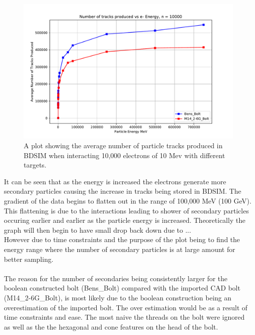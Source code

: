 \documentclass[12pt,a4paper]{article}
\begin{document}
\begin{figure}[h!]
\centering
\includegraphics[width=1\textwidth]{Images//CAD_Screw//boltcount.pdf}
\caption[width=\columnwidth]{A plot showing the average number of particle tracks produced in BDSIM when interacting 10,000 electrons of 10 Mev with different targets.}
\label{boltcount}
\end{figure}

\noindent It can be seen that as the energy is increased the electrons generate more secondary particles causing the increase in tracks being stored in BDSIM. The gradient of the data begins to flatten out in the range of 100,000 MeV (100 GeV). This flattening is due to the interactions leading to shower of secondary particles occuring earlier and earlier as the particle energy is increased. Theoretically the graph will then begin to have small drop back down due to ...\\

However due to time constraints and the purpose of the plot being to find the energy range where the number of secondary particles is at large amount for better sampling.
\\\\
\noindent The reason for the number of secondaries being consistently larger for the boolean constructed bolt (Bens\_Bolt) compared with the imported CAD bolt (M14\_2-6G\_Bolt), is most likely due to the boolean construction being an overestimation of the imported bolt. The over estimation would be as a result of  time constraints and ease. The most naive  the threads on the bolt were ignored as well as the the hexagonal and cone features on the head of the bolt.
\end{document}

